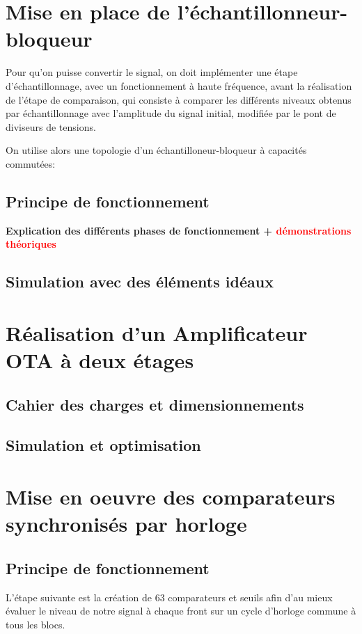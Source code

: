 \documentclass[11pt]{article}
\begin{document}
\section{Mise en place de l'\'echantillonneur-bloqueur}
Pour qu'on puisse convertir le signal, on doit impl\'ementer une \'etape d'\'echantillonnage, avec un fonctionnement \`a haute fr\'equence,
 avant la r\'ealisation de l'\'etape de comparaison, qui consiste \`a comparer les diff\'erents niveaux obtenus par \'echantillonnage avec l'amplitude du signal initial,
  modifi\'ee par le pont de diviseurs de tensions.

On utilise alors une topologie d'un \'echantilloneur-bloqueur \`a capacit\'es commut\'ees:

\subsection{Principe de fonctionnement}

\begin{center}
    \textbf{Explication des diff\'erents phases de fonctionnement + \textcolor{red}{d\'emonstrations th\'eoriques}}
\end{center}

\subsection{Simulation avec des \'el\'ements id\'eaux}

\section{R\'ealisation d'un Amplificateur OTA \`a deux \'etages}

\subsection{Cahier des charges et dimensionnements}
\subsection{Simulation et optimisation}

\section{Mise en oeuvre des comparateurs synchronis\'es par horloge}
\subsection{Principe de fonctionnement}
L'\'etape suivante est la cr\'eation de 63 comparateurs et seuils afin d'au mieux \'evaluer le niveau de
notre signal \`a chaque front sur un cycle d'horloge commune \`a tous les blocs.
\end{document}
